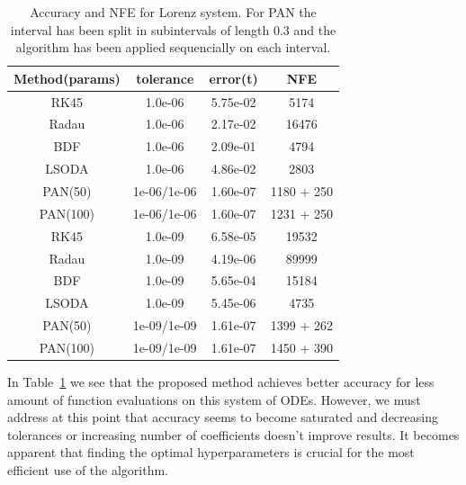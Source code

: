 \documentclass[11pt]{report}
\begin{document}
    \begin{table}[!h]
        \begin{center}
            \caption{Accuracy and NFE for Lorenz system. For PAN the interval has been split in subintervals of length
                $0.3$ and the algorithm has been applied sequencially on each interval.}
            \label{lorenz_metric}
            \renewcommand{\arraystretch}{1.5}
            \renewcommand{\tabcolsep}{10.25pt}
            \begin{tabular}{|c|c|c|c|}
                \hline
                Method(params) & tolerance & error(t) & NFE \\
                \hline
                RK45 & 1.0e-06 & 5.75e-02 & 5174
                \\ \hline
                Radau & 1.0e-06 & 2.17e-02 & 16476
                \\ \hline
                BDF & 1.0e-06 & 2.09e-01 & 4794
                \\ \hline
                LSODA & 1.0e-06 & 4.86e-02 & 2803
                \\ \hline
                PAN(50) & 1e-06/1e-06 & 1.60e-07 & 1180 + 250
                \\ \hline
                PAN(100) & 1e-06/1e-06 & 1.60e-07 & 1231 + 250
                \\ \hline\hline
                RK45 & 1.0e-09 & 6.58e-05 & 19532
                \\ \hline
                Radau & 1.0e-09 & 4.19e-06 & 89999
                \\ \hline
                BDF & 1.0e-09 & 5.65e-04 & 15184
                \\ \hline
                LSODA & 1.0e-09 & 5.45e-06 & 4735
                \\ \hline
                PAN(50) & 1e-09/1e-09 & 1.61e-07 & 1399 + 262
                \\ \hline
                PAN(100) & 1e-09/1e-09 & 1.61e-07 & 1450 + 390
                \\ \hline
            \end{tabular}
        \end{center}
    \end{table}

    In Table~\ref{lorenz_metric} we see that the proposed method achieves better accuracy for less amount of function
    evaluations on this system of ODEs.
    However, we must address at this point that accuracy seems to become saturated and decreasing tolerances or increasing number
    of coefficients doesn't improve results.
    It becomes apparent that finding the optimal hyperparameters is crucial for the most efficient use of the algorithm.
\end{document}
